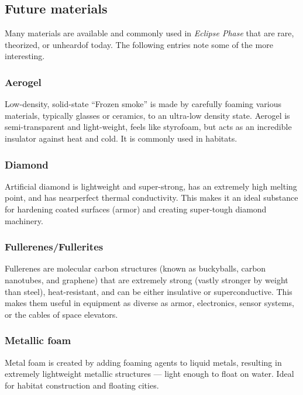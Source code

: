\subsection{Future materials}
\label{sec:future-materials}

Many materials are available and commonly used in \emph{Eclipse Phase} that are rare, theorized, or unheardof today. The following entries note some of the more interesting.

\subsubsection{Aerogel}

Low-density, solid-state ``Frozen smoke'' is made by carefully foaming various materials, typically glasses or ceramics, to an ultra-low density state. Aerogel is semi-transparent and light-weight, feels like styrofoam, but acts as an incredible insulator against heat and cold. It is commonly used in habitats.

\subsubsection{Diamond}

Artificial diamond is lightweight and super-strong, has an extremely high melting point, and has nearperfect thermal conductivity. This makes it an ideal substance for hardening coated surfaces (armor) and creating super-tough diamond machinery.

\subsubsection{Fullerenes/Fullerites}

Fullerenes are molecular carbon structures (known as buckyballs, carbon nanotubes, and graphene) that are extremely strong (vastly stronger by weight than steel), heat-resistant, and can be either insulative or superconductive. This makes them useful in equipment as diverse as armor, electronics, sensor systems, or the cables of space elevators.

\subsubsection{Metallic foam}

Metal foam is created by adding foaming agents to liquid metals, resulting in extremely lightweight metallic structures --- light enough to float on water. Ideal for habitat construction and floating cities.

